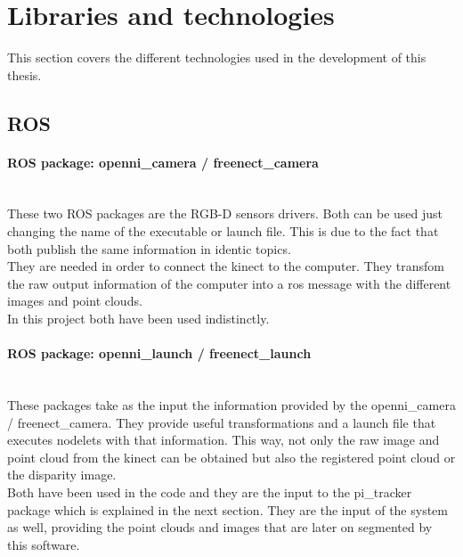 \newpage
\section{Libraries and technologies}
\label{libraries_and_technologies}

This section covers the different technologies used in the development of this thesis.

	\subsection{ROS}

		\paragraph{ROS package: openni\_camera / freenect\_camera}\mbox{} \\

		These two ROS packages are the RGB-D sensors drivers. Both can be used just changing the name of the executable or launch file. This is due to the fact that both publish the same information in identic topics. 
		\\

		They are needed in order to connect the kinect to the computer. They transfom the raw output information of the computer into a ros message with the different images and point clouds. 
		\\

		In this project both have been used indistinctly.  

		\paragraph{ROS package: openni\_launch / freenect\_launch}\mbox{} \\

		These packages take as the input the information provided by the openni\_camera / freenect\_camera. They provide useful transformations and a launch file that executes nodelets with that information. This way, not only the raw image and point cloud from the kinect can be obtained but also the registered point cloud or the disparity image. 
		\\

		Both have been used in the code and they are the input to the pi\_tracker package which is explained in the next section. They are the input of the system as well, providing the point clouds and images that are later on segmented by this software. 



